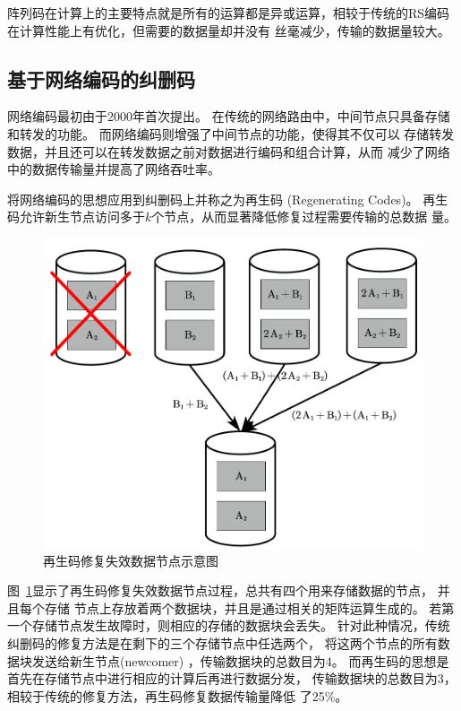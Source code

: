 阵列码在计算上的主要特点就是所有的运算都是异或运算，相较于传统的RS编码在计算性能上有优化，但需要的数据量却并没有
丝毫减少，传输的数据量较大。


\subsection{基于网络编码的纠删码}
网络编码最初由\citet{ahlswede2000network}于2000年首次提出。
在传统的网络路由中，中间节点只具备存储和转发的功能。
而网络编码则增强了中间节点的功能，使得其不仅可以
存储转发数据，并且还可以在转发数据之前对数据进行编码和组合计算，从而
减少了网络中的数据传输量并提高了网络吞吐率。

\citet{dimakis2010network}将网络编码的思想应用到纠删码上并称之为再生码
(Regenerating Codes)。
再生码允许新生节点访问多于$k$个节点，从而显著降低修复过程需要传输的总数据
量。


\begin{figure}[tb]
	\centering
	\includegraphics [scale=0.7]{figures/1.6.pdf}
	\caption{再生码修复失效数据节点示意图}
	\label{fig:con-1.6}
\end{figure}

图~\ref{fig:con-1.6}显示了再生码修复失效数据节点过程，总共有四个用来存储数据的节点，
并且每个存储
节点上存放着两个数据块，并且是通过相关的矩阵运算生成的。
若第一个存储节点发生故障时，则相应的存储的数据块会丢失。
针对此种情况，传统纠删码的修复方法是在剩下的三个存储节点中任选两个，
将这两个节点的所有数据块发送给新生节点(newcomer)
，传输数据块的总数目为4。
而再生码的思想是首先在存储节点中进行相应的计算后再进行数据分发，
传输数据块的总数目为3，相较于传统的修复方法，再生码修复数据传输量降低
了25\%。


